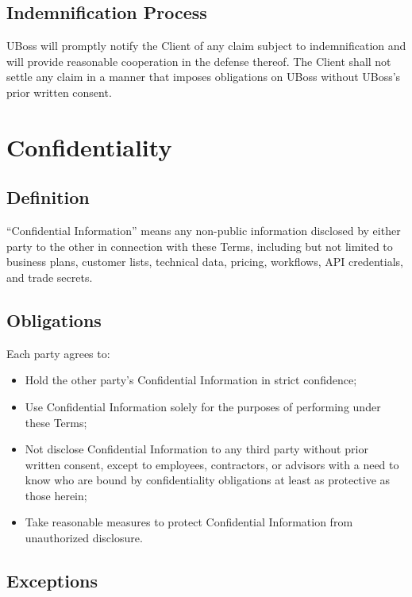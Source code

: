 \documentclass[11pt,letterpaper,parskip=half]{scrartcl}
\begin{document}
\subsection{Indemnification Process}

UBoss will promptly notify the Client of any claim subject to indemnification and will provide reasonable cooperation in the defense thereof. The Client shall not settle any claim in a manner that imposes obligations on UBoss without UBoss's prior written consent.

\section{Confidentiality}

\subsection{Definition}

``Confidential Information'' means any non-public information disclosed by either party to the other in connection with these Terms, including but not limited to business plans, customer lists, technical data, pricing, workflows, API credentials, and trade secrets.

\subsection{Obligations}

Each party agrees to:

\begin{itemize}[nosep, leftmargin=1.5em]
    \item Hold the other party's Confidential Information in strict confidence;
    \item Use Confidential Information solely for the purposes of performing under these Terms;
    \item Not disclose Confidential Information to any third party without prior written consent, except to employees, contractors, or advisors with a need to know who are bound by confidentiality obligations at least as protective as those herein;
    \item Take reasonable measures to protect Confidential Information from unauthorized disclosure.
\end{itemize}

\subsection{Exceptions}
\end{document}
